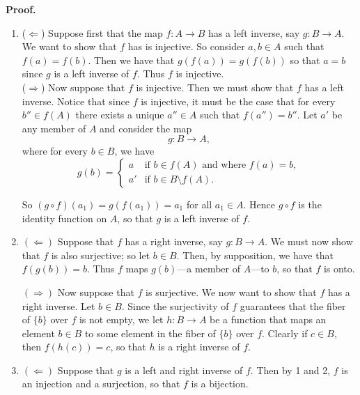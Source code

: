 \begin{enumerate}
      \textbf{Proof.}
      \begin{enumerate}
         \item ($\Leftarrow$) Suppose first that the map $f : A \rightarrow B$ 
               has a left inverse, say $g : B \rightarrow A$. We want to show 
               that $f$ has is injective. So consider $a, b \in A$ such that
               $f(a) = f(b)$. Then we have that $g(f(a)) = g(f(b))$ so that
               $a = b$ since $g$ is a left inverse of $f$. Thus $f$ is
               injective. \\
               ($\Rightarrow$) Now suppose that $f$ is injective. Then we must 
               show that $f$ has	a left inverse. Notice that since $f$ is 
               injective, it must be the case that for every $b'' \in f(A)$ 
               there exists a unique $a'' \in A$ such that $f(a'') = b''$. Let 
               $a'$ be any member of $A$ and consider the map
	            $$g : B \rightarrow A,$$
	            where for every $b \in B$, we have
	            \begin{equation*}
		            g(b) = \left\{
			            \begin{array}{ll}
				            a & \text{if } b \in f(A) \text{ and where } f(a) = b,\\
                        a' & \text{if } b \in B\setminus f(A).
                     \end{array} \right.
               \end{equation*}
   
               So $(g \circ f)(a_1) = g(f(a_1)) = a_1$ for all $a_1 \in A$.
               Hence $g \circ f$ is the identity function on $A$, so that $g$ is
               a left inverse of $f$.

         \item $(\Leftarrow)$ Suppose that $f$ has a right inverse, say
               $g : B \rightarrow A$. We must now show that $f$ is also 
               surjective; so let $b \in B$. Then, by supposition, we have that 
               $f(g(b)) = b$. Thus $f$ maps $g(b)$---a member of $A$---to $b$, 
               so that $f$ is onto.
   
               $(\Rightarrow)$ Now suppose that $f$ is surjective. We now want 
               to show that $f$ has a right inverse. Let $b \in B$. Since the 
               surjectivity of $f$ guarantees that the fiber of $\{b\}$ over $f$
               is not empty, we let $h : B \rightarrow A$ be a function that 
               maps an element $b \in B$ to some element in the fiber of $\{b\}$
               over $f$. Clearly if $c \in B$, then $f(h(c)) = c$, so that $h$ 
               is a right inverse of $f$.
         \item $(\Leftarrow)$ Suppose that $g$ is a left and right inverse of
               $f$. Then by 1 and 2, $f$ is an injection and a surjection, so 
               that $f$ is a bijection.
   

\end{enumerate}
\end{enumerate}
